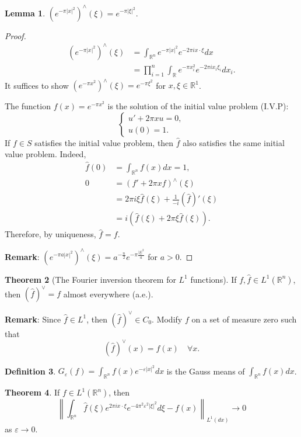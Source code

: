 \documentclass[12pt,openany]{book}
\theoremstyle{definition}
\newtheorem{theorem}{Theorem}[section]
\newtheorem{lemma}[theorem]{Lemma}
\newtheorem{definition}[theorem]{Definition}
\begin{document}
\begin{lemma}
 $\left(e^{-\pi|x|^2}\right)^{\wedge}(\xi) = e^{-\pi|\xi|^2}$.
\end{lemma}
\begin{proof}
$$
    \begin{aligned}
\left(e^{-\pi|x|^2}\right)^{\wedge}(\xi) &= \int_{\mathbb{R}^n} e^{-\pi|x|^2} e^{-2 \pi i x \cdot \xi} dx \\
&= \prod_{i=1}^n \int_{\mathbb{R}} e^{-\pi x_i^2} e^{-2 \pi i x_i \xi_i} dx_i.
\end{aligned}
$$
It suffices to show $\left(e^{-\pi x^2}\right)^{\wedge}(\xi) = e^{-\pi \xi^2}$ for $x, \xi \in \mathbb{R}^1$.

The function $f(x) = e^{-\pi x^2}$ is the solution of the initial value problem (I.V.P):
$$
\begin{cases}
u' + 2\pi x u = 0, \\
u(0) = 1.
\end{cases}
$$
If $f \in S$ satisfies the initial value problem, then $\hat{f}$ also satisfies the same initial value problem. Indeed,
$$
\begin{aligned}
\hat{f}(0) &= \int_{\mathbb{R}^n} f(x) dx = 1, \\
0 &= \left(f' + 2\pi x f\right)^{\wedge}(\xi) \\
&= 2\pi i \xi \hat{f}(\xi) + \frac{1}{-i}(\hat{f})'(\xi) \\
&= i(\hat{f}(\xi) + 2\pi \xi \hat{f}(\xi)).
\end{aligned}
$$
Therefore, by uniqueness, $\hat{f} = f$.

\noindent\textbf{Remark}: $\left(e^{-\pi a|x|^2}\right)^{\wedge}(\xi) = a^{-\frac{n}{2}} e^{-\pi \frac{|\xi|^2}{a}}$ for $a > 0$.
\end{proof}
\begin{theorem}[The Fourier inversion theorem for $L^{1}$ functions]\label{thm2.1}
    If $f, \hat{f} \in L^1\left(\mathbb{R}^n\right)$, then $(\hat{f})^\vee = f$ almost everywhere (a.e.).

\end{theorem}
\noindent\textbf{Remark}: Since $\hat{f} \in L^{1}$, then $(\hat{f})^\vee \in C_0$. Modify $f$ on a set of measure zero such that
$$
(\hat{f})^\vee(x) = f(x) \quad \forall x.
$$
\begin{definition}
    $G_{\varepsilon}(f) = \int_{\mathbb{R}^n} f(x) e^{-\varepsilon|x|^2} dx$ is the Gauss means of $\int_{\mathbb{R}^n} f(x) dx$.
\end{definition}
\begin{theorem}
    If $f \in L^{1}\left(\mathbb{R}^n\right)$, then
$$
\left\| \int_{\mathbb{R}^n} \hat{f}(\xi) e^{2 \pi i x \cdot \xi} e^{-4 \pi^2 \varepsilon^2|\xi|^2} d\xi - f(x) \right\|_{L^{1}(dx)} \rightarrow 0
$$
as $\varepsilon \rightarrow 0$.
\end{theorem}
\end{document}
